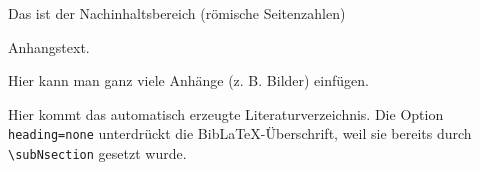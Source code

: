 \documentclass[12pt,a4paper]{article}
\begin{document}
\begin{PostContent}
	Das ist der Nachinhaltsbereich (römische Seitenzahlen)

	Anhangstext.

	Hier kann man ganz viele Anhänge (z. B. Bilder) einfügen.


	\printacronyms[heading=none]


	Hier kommt das automatisch erzeugte Literaturverzeichnis. Die Option \verb|heading=none| unterdrückt die BibLaTeX-Überschrift, weil sie bereits durch \verb|\subNsection| gesetzt wurde.

	\printbibliography[heading=none]
\end{PostContent}
\end{document}
